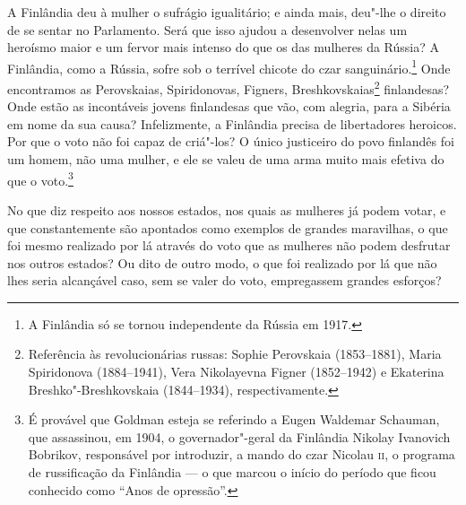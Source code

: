 A Finlândia deu à mulher o sufrágio igualitário; e ainda mais, deu"-lhe o
direito de se sentar no Parlamento. Será que isso ajudou a desenvolver
nelas um heroísmo maior e um fervor mais intenso do que os das
mulheres da Rússia? A Finlândia, como a Rússia, sofre sob o terrível
chicote do czar sanguinário.\footnote{A Finlândia só se tornou
  independente da Rússia em 1917.} Onde encontramos as Perovskaias,
Spiridonovas, Figners, Breshkovskaias\footnote{Referência
  às revolucionárias russas: Sophie Perovskaia (1853--1881), Maria
  Spiridonova (1884--1941), Vera Nikolayevna Figner (1852--1942)
  e Ekaterina Breshko"-Breshkovskaia (1844--1934), respectivamente.
  }
finlandesas? Onde estão as incontáveis jovens finlandesas que vão, com
alegria, para a Sibéria em nome da sua causa? Infelizmente, a
Finlândia precisa de libertadores heroicos. Por que o voto não foi capaz
de criá"-los? O único justiceiro do povo finlandês foi um homem, não uma
mulher, e ele se valeu de uma arma muito mais efetiva do que o
voto.\footnote{É provável que Goldman esteja se referindo a Eugen
  Waldemar Schauman, que assassinou, em 1904, o governador"-geral da
  Finlândia Nikolay Ivanovich Bobrikov, responsável por introduzir, a
  mando do czar Nicolau \textsc{ii}, o programa de russificação da Finlândia --- o
  que marcou o início do período que ficou conhecido como ``Anos de
  opressão''.}

No que diz respeito aos nossos estados, nos quais as mulheres já podem votar, e
que constantemente são apontados como exemplos de grandes maravilhas, o
que foi mesmo realizado por lá através do voto que as mulheres não podem
desfrutar nos outros estados? Ou dito de outro modo, o que foi realizado
por lá que não lhes seria alcançável caso, sem se valer do
voto, empregassem grandes esforços?

